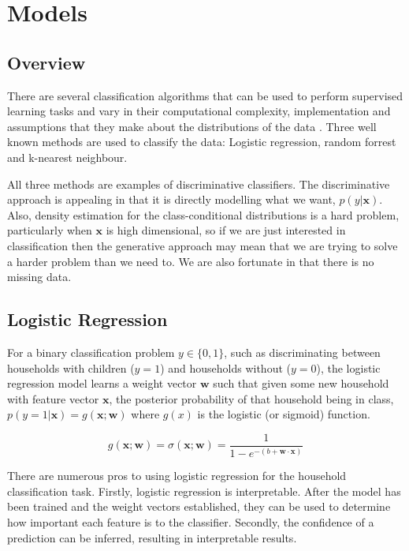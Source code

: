 
\chapter{Models}

\section{Overview}
There are several classification algorithms that can be used to perform supervised learning tasks and vary in their computational complexity, implementation and assumptions that they make about the distributions of the data \cite{Beckel_3}. Three well known methods are used to classify the data: Logistic regression, random forrest and k-nearest neighbour.

All three methods are examples of discriminative classifiers. The discriminative approach is appealing in that it is directly modelling what we want, $p(y|\textbf{x})$. Also, density estimation for the class-conditional distributions is a hard problem, particularly when $\textbf{x}$ is high dimensional, so if we are just interested in classification then the generative approach may mean that we are trying to solve a harder problem than we need to\cite{Williams}. We are also fortunate in that there is no missing data. 

\section{Logistic Regression}
For a binary classification problem $y\in \{0,1\}$, such as discriminating between households with children ($y=1$) and households without ($y=0$), the logistic regression model learns a weight vector $\textbf{w}$ such that given some new household with feature vector $\textbf{x}$, the posterior probability of that household being in class, $p(y=1|\textbf{x})=g(\textbf{x}; \textbf{w})$ where $g(x)$ is the logistic (or sigmoid) function.

\[g(\textbf{x}; \textbf{w})=\sigma(\textbf{x};\textbf{w})=\frac{1}{1-e^{-(b+\textbf{w}\cdot{\textbf{x}})}}\]

There are numerous pros to using logistic regression for the household classification task. Firstly, logistic regression is interpretable. After the model has been trained and the weight vectors established, they can be used to determine how important each feature is to the classifier. Secondly, the confidence of a prediction can be inferred, resulting in interpretable results.


